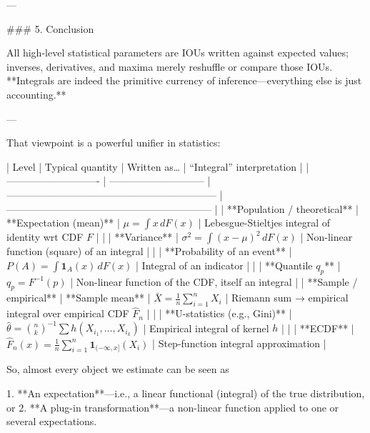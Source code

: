 ---

### 5.  Conclusion

All high-level statistical parameters are IOUs written against expected values; inverses, derivatives, and maxima merely reshuffle or compare those IOUs.  **Integrals are indeed the primitive currency of inference—everything else is just accounting.**

---

That viewpoint is a powerful unifier in statistics:

| Level                        | Typical quantity              | Written as…                                                     | “Integral” interpretation                                      |
| ---------------------------- | ----------------------------- | --------------------------------------------------------------- | -------------------------------------------------------------- |
| **Population / theoretical** | **Expectation (mean)**        | $\mu = \int x\,dF(x)$                                           | Lebesgue-Stieltjes integral of identity wrt CDF $F$            |
|                              | **Variance**                  | $\sigma^{2}= \int (x-\mu)^2\,dF(x)$                             | Non-linear function (square) of an integral                    |
|                              | **Probability of an event**   | $P(A)=\int \mathbf 1_A(x)\,dF(x)$                               | Integral of an indicator                                       |
|                              | **Quantile $q_p$**            | $q_p = F^{-1}(p)$                                               | Non-linear function of the CDF, itself an integral             |
| **Sample / empirical**       | **Sample mean**               | $\bar X = \frac1n\sum_{i=1}^{n}X_i$                             | Riemann sum → empirical integral over empirical CDF $\hat F_n$ |
|                              | **U-statistics (e.g., Gini)** | $\hat\theta=\binom{n}{k}^{-1}\!\!\sum h(X_{i_1},\dots,X_{i_k})$ | Empirical integral of kernel $h$                               |
|                              | **ECDF**                      | $\hat F_n(x)=\frac1n\sum_{i=1}^{n}\mathbf 1_{(-\infty,x]}(X_i)$ | Step-function integral approximation                           |

So, almost every object we estimate can be seen as

1. **An expectation**—i.e., a linear functional (integral) of the true distribution, or
2. **A plug-in transformation**—a non-linear function applied to one or several expectations.

